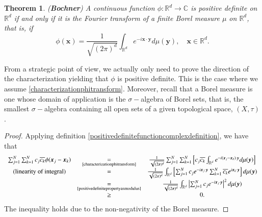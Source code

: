 \documentclass[12pt]{report} %
\newtheorem{theorem}{Theorem}
\newcommand{\tmmathbf}[1]{\ensuremath{\boldsymbol{#1}}}
\newcommand{\tmstrong}[1]{\textbf{#1}}
\providecommand{\xequal}[2][]{\mathop{=}\limits_{#1}^{#2}}
\begin{document}
\begin{theorem}\label{tm-bochner}
  ({\tmstrong{Bochner}}) A continuous function $\phi : \mathbb{R}^d
    \rightarrow \mathbb{C}$ is positive definite on $\mathbb{R}^d$ if and only
  if it is the Fourier transform of a finite Borel measure $\mu$
  on $\mathbb{R}^d$, that is, if
  \begin{equation}
    \phi (\tmmathbf{x}) = \frac{1}{\sqrt{(2 \pi)^d}} \int_{\mathbb{R}^d} e^{-
        i\tmmathbf{x} \cdot \tmmathbf{y}} d \mu (\tmmathbf{y}), \quad \tmmathbf{x}
    \in \mathbb{R}^d . \label{characterizationphitransform}
  \end{equation}
\end{theorem}

From a strategic point of view, we actually only need to prove the direction of the characterization yielding that $\phi$ is positive definite. This is the case where we assume \eqref{characterizationphitransform}. Moreover, recall that a Borel measure is one whose domain of application is the $\sigma-$algebra of Borel sets, that is, the smallest $\sigma-$algebra containing all open sets of a given topological space, $(X,\tau)$.

\begin{proof}
  Applying definition \eqref{positivedefinitefunctioncomplexdefinition}, we
  have that
  \[ \begin{array}{ccc}
      \sum_{j = 1}^N \sum_{k = 1}^N c_j \overline{c_k} \phi (\tmmathbf{x}_j
      -\tmmathbf{x}_k)                                       &
      \xequal[\text{\eqref{characterizationphitransform}}]{} &
      \frac{1}{\sqrt{(2 \pi)^d}} \sum_{j = 1}^N \sum_{k = 1}^N \left[ c_j
        \overline{c_k} \int_{\mathbb{R}^d} e^{- i (\tmmathbf{x}_j
      -\tmmathbf{x}_k) \cdot \tmmathbf{y}} d \mu (\tmmathbf{y}) \right]                                                                                 \\
      \text{(linearity of integral)}                         & =                                                           & \frac{1}{\sqrt{(2 \pi)^d}}
      \int_{\mathbb{R}^d} \left[ \sum_{j = 1}^N c_j e^{- i\tmmathbf{x}_j
            \cdot \tmmathbf{y}} \sum_{k = 1}^N \overline{c_k} e^{i\tmmathbf{x}_k
      \cdot \tmmathbf{y}} \right] d \mu (\tmmathbf{y})                                                                                                  \\
                                                             & \xequal[\text{\eqref{positivedefinitepropertyasmodulus}}]{} &
      \frac{1}{\sqrt{(2 \pi)^d}} \int_{\mathbb{R}^d} \left| \sum_{j = 1}^N
      c_j e^{- i\tmmathbf{x}_j \cdot \tmmathbf{y}} \right|^2 d \mu
      (\tmmathbf{y})                                                                                                                                    \\
                                                             & \geq                                                        & 0.
    \end{array} \]
  The inequality holds due to the non-negativity of the Borel measure.
\end{proof}
\end{document}
